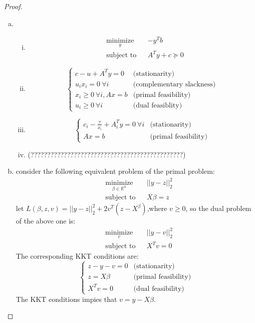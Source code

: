 \documentclass{article}
\theoremstyle{remark}
\theoremstyle{definition}
\begin{document}
    
\begin{proof}

\begin{enumerate}[(a)]
    \item \begin{enumerate}[(i)]
        \item \begin{equation*}
\begin{aligned}
& \underset{y}{\text{minimize}}
& & -y^Tb \\
& \text{subject to}
& & A^Ty+c \succcurlyeq 0
\end{aligned}
\end{equation*}
\item \[\left \{ \begin{array}{cc}
    c-u+A^Ty=0 & \text{(stationarity)}\\
    u_ix_i=0~\forall i& \text{(complementary slackness)}\\
    x_i\geq 0~\forall i, Ax=b& \text{(primal feasibility)}\\
   u_i\geq 0 ~\forall i & \text{(dual feasiblity)}
    \end{array}\right.
     \]
\item  \[\left \{ \begin{array}{cc}
     c_i-\frac{\tau}{x_i}+A_i^Ty= 0~\forall i &  \text{(stationarity)}\\
     Ax=b & \text{(primal feasibility)}
     \end{array}\right.
     \]
\item  (??????????????????????????????????????????????)
\end{enumerate}
\item consider the following equivalent problem of the primal problem:
\begin{equation*}
\begin{aligned}
& \underset{\beta\in \mathbb{R}^n}{\text{minimize}}
& & ||y-z||^2_2 \\
& \text{subject to}
& & X\beta=z
\end{aligned}
\end{equation*}
let $L(\beta,z,v)=||y-z||_2^2+2v^T(z-X^\beta)$,where $v\geq 0$, so the dual problem of the above one is:
 \begin{equation*}
\begin{aligned}
& \underset{v}{\text{minimize}}
& & ||y-v||_2^2\\
& \text{subject to}
& & X^Tv=0
\end{aligned}
\end{equation*} 
The corresponding KKT conditions are:
\[\left \{ \begin{array}{cc}
    z-y-v=0 & \text{(stationarity)}\\
    z=X\beta & \text{(primal feasibility)}\\
    X^Tv=0 & \text{(dual feasibility)} \end{array}\right.
    \]
The KKT conditions impies that $v=y-X\beta$.
   

\end{enumerate}
\end{proof}
\end{document}
